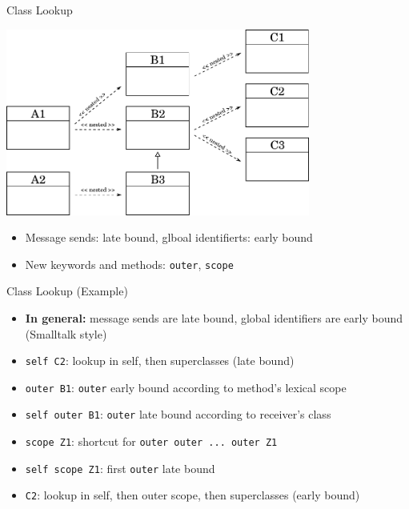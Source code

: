 \documentclass[xcolor=dvipsname, handout]{beamer} %
\begin{document}
\begin{frame}{Class Lookup}
  \begin{table}
    \centering
    \includegraphics[width=0.75\textwidth]{class_lookup.pdf}
  \end{table}

  \begin{itemize}
    \item Message sends: late bound, glboal identifierts: early bound
    \item New keywords and methods: \texttt{outer}, \texttt{scope}
  \end{itemize}
\end{frame}

\begin{frame}{Class Lookup (Example)}
  \begin{itemize}
    \item \textbf{In general:} message sends are late bound, global identifiers are early bound (Smalltalk style)
    \item \texttt{self C2}: lookup in self, then superclasses (late bound)
    \item \texttt{outer B1}: \texttt{outer} early bound according to method's lexical scope
    \item \texttt{self outer B1}: \texttt{outer} late bound according to receiver's class
    \item \texttt{scope Z1}: shortcut for \texttt{outer outer ... outer Z1}
    \item \texttt{self scope Z1}: first \texttt{outer} late bound
    \item \texttt{C2}: lookup in self, then outer scope, then superclasses (early bound)
  \end{itemize}
\end{frame}
\end{document}
